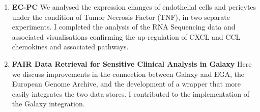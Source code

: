 \begin{enumerate}[label=\ref{chapter:cancer}.\arabic*]
\itemsep-0.5em
\setcounter{enumi}{-1}
\item \textbf{EC-PC} We analysed the expression changes of endothelial cells and pericytes under the condition of Tumor Necrosis Factor (TNF), in two separate experiments. I completed the analysis of the RNA Sequencing data and associated visualisations confirming the up-regulation of CXCL and CCL chemokines and associated pathways.

\item \textbf{FAIR Data Retrieval for Sensitive Clinical Analysis in Galaxy} Here we discuss improvements in the connection between Galaxy and EGA, the European Genome Archive, and the development of a wrapper that more easily integrates the two data stores. I contributed to the implementation of the Galaxy integration.


\end{enumerate}

